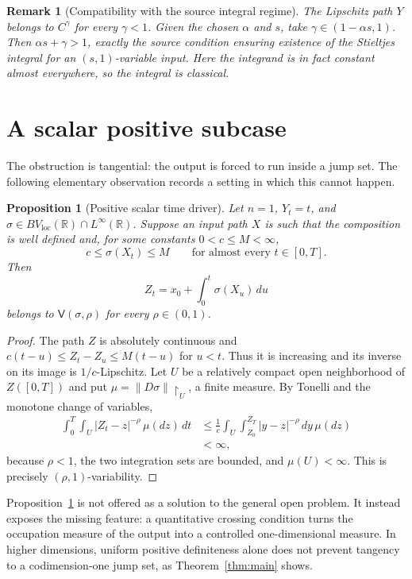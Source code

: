 \documentclass[11pt]{article}
\newtheorem{proposition}{Proposition}
\newtheorem{remark}{Remark}
\newcommand{\R}{\mathbb{R}}
\newcommand{\BV}{BV_{\mathrm{loc}}}
\newcommand{\V}{\mathsf{V}}
\begin{document}
\begin{remark}[Compatibility with the source integral regime]
The Lipschitz path $Y$ belongs to $C^\gamma$ for every $\gamma<1$.  Given the
chosen $\alpha$ and $s$, take $\gamma\in(1-\alpha s,1)$.  Then
$\alpha s+\gamma>1$, exactly the source condition ensuring existence of the
Stieltjes integral for an $(s,1)$-variable input.  Here the integrand is in
fact constant almost everywhere, so the integral is classical.
\end{remark}

\section{A scalar positive subcase}

The obstruction is tangential: the output is forced to run inside a jump set.
The following elementary observation records a setting in which this cannot
happen.

\begin{proposition}[Positive scalar time driver]\label{prop:scalar}
Let $n=1$, $Y_t=t$, and $\sigma\in\BV(\R)\cap L^\infty(\R)$.  Suppose an input
path $X$ is such that the composition is well defined and, for some constants
$0<c\leq M<\infty$,
\[
 c\leq \sigma(X_t)\leq M\qquad\text{for almost every }t\in[0,T].
\]
Then
\[
 Z_t=x_0+\int_0^t\sigma(X_u)\,du
\]
belongs to $\V(\sigma,\rho)$ for every $\rho\in(0,1)$.
\end{proposition}

\begin{proof}
The path $Z$ is absolutely continuous and
$c(t-u)\leq Z_t-Z_u\leq M(t-u)$ for $u<t$.  Thus it is increasing and its
inverse on its image is $1/c$-Lipschitz.  Let $U$ be a relatively compact open
neighborhood of $Z([0,T])$ and put
$\mu=\lVert D\sigma\rVert\!\restriction_U$, a finite measure.  By Tonelli and
the monotone change of variables,
\begin{align*}
 \int_0^T\int_U |Z_t-z|^{-\rho}\,\mu(dz)\,dt
 &\leq \frac1c\int_U\int_{Z_0}^{Z_T}|y-z|^{-\rho}\,dy\,\mu(dz)\\
 &<\infty,
\end{align*}
because $\rho<1$, the two integration sets are bounded, and $\mu(U)<\infty$.
This is precisely $(\rho,1)$-variability.
\end{proof}

Proposition~\ref{prop:scalar} is not offered as a solution to the general open
problem.  It instead exposes the missing feature: a quantitative crossing
condition turns the occupation measure of the output into a controlled
one-dimensional measure.  In higher dimensions, uniform positive
definiteness alone does not prevent tangency to a codimension-one jump set, as
Theorem~\ref{thm:main} shows.
\end{document}
